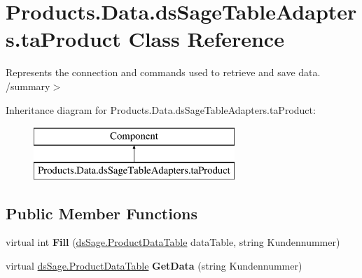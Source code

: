 \hypertarget{class_products_1_1_data_1_1ds_sage_table_adapters_1_1ta_product}{}\section{Products.\+Data.\+ds\+Sage\+Table\+Adapters.\+ta\+Product Class Reference}
\label{class_products_1_1_data_1_1ds_sage_table_adapters_1_1ta_product}


Represents the connection and commands used to retrieve and save data. /summary$>$  


Inheritance diagram for Products.\+Data.\+ds\+Sage\+Table\+Adapters.\+ta\+Product\+:\begin{figure}[H]
\begin{center}
\leavevmode
\includegraphics[height=2.000000cm]{class_products_1_1_data_1_1ds_sage_table_adapters_1_1ta_product}
\end{center}
\end{figure}
\subsection*{Public Member Functions}
\begin{DoxyCompactItemize}
\item 
virtual int {\bfseries Fill} (\hyperlink{class_products_1_1_data_1_1ds_sage_1_1_product_data_table}{ds\+Sage.\+Product\+Data\+Table} data\+Table, string Kundennummer)\hypertarget{class_products_1_1_data_1_1ds_sage_table_adapters_1_1ta_product_a9227ae83b0f0f459e797f635d030c9c5}{}\label{class_products_1_1_data_1_1ds_sage_table_adapters_1_1ta_product_a9227ae83b0f0f459e797f635d030c9c5}

\item 
virtual \hyperlink{class_products_1_1_data_1_1ds_sage_1_1_product_data_table}{ds\+Sage.\+Product\+Data\+Table} {\bfseries Get\+Data} (string Kundennummer)\hypertarget{class_products_1_1_data_1_1ds_sage_table_adapters_1_1ta_product_a53697a32c59d46d8c15d63db3834e44b}{}\label{class_products_1_1_data_1_1ds_sage_table_adapters_1_1ta_product_a53697a32c59d46d8c15d63db3834e44b}

\end{DoxyCompactItemize}
